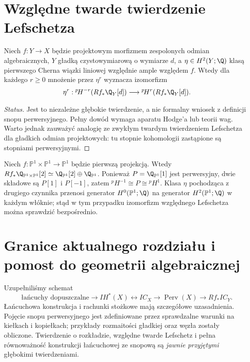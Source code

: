 \section{Względne twarde twierdzenie Lefschetza}
\begin{twierdzenie}
\label{thm:relative-hard-lefschetz-xiii}
Niech $f:Y\to X$ będzie projektowym morfizmem
zespolonych odmian algebraicznych, $Y$
gładką czystowymiarową o wymiarze $d$,
a $\eta\in H^2(Y;\Q)$ klasą pierwszego Cherna
wiązki liniowej względnie ample względem $f$.
Wtedy dla każdego $r\ge0$ mnożenie przez
$\eta^r$ wyznacza izomorfizm
\[
\eta^r:{}^p\!H^{-r}(Rf_*\Q_Y[d])
\longrightarrow{}^p\!H^{r}(Rf_*\Q_Y[d]).
\]
\end{twierdzenie}
\begin{proof}[Status]
Jest to niezależne głębokie twierdzenie, a nie
formalny wniosek z definicji snopu perwersyjnego.
Pełny dowód wymaga aparatu Hodge'a lub teorii wag.
Warto jednak zauważyć analogię ze zwykłym twardym
twierdzeniem Lefschetza dla gładkich odmian
projektowych: tu stopnie kohomologii zastąpione
są stopniami perwersyjnymi.
\end{proof}
\begin{przyklad}
Niech $f:\mathbb P^1\times\mathbb P^1\to\mathbb P^1$
będzie pierwszą projekcją. Wtedy
$Rf_*\Q_{\mathbb P^1\times\mathbb P^1}[2]
\simeq\Q_{\mathbb P^1}[2]\oplus\Q_{\mathbb P^1}$.
Ponieważ $P=\Q_{\mathbb P^1}[1]$ jest perwersyjny,
dwie składowe są $P[1]$ i $P[-1]$, zatem
${}^p\!H^{-1}\cong P\cong{}^p\!H^{1}$.
Klasa $\eta$ pochodząca z drugiego czynnika
przenosi generator $H^0(\mathbb P^1;\Q)$ na
generator $H^2(\mathbb P^1;\Q)$ w każdym włóknie;
stąd w tym przypadku izomorfizm względnego
Lefschetza można sprawdzić bezpośrednio.
\end{przyklad}

\section{Granice aktualnego rozdziału i pomost do geometrii algebraicznej}
Uzupełniliśmy schemat
\[
\text{łańcuchy dopuszczalne}
\longrightarrow IH^*(X)
\longleftrightarrow IC_X
\longrightarrow\operatorname{Perv}(X)
\longrightarrow Rf_*IC_Y.
\]
Łańcuchowa konstrukcja i rachunki stożkowe
mają szczegółowe uzasadnienia. Pojęcie snopu
perwersyjnego jest zdefiniowane przez
sprawdzalne warunki na kiełkach i kopiełkach;
przykłady rozmaitości gładkiej oraz węzła
zostały obliczone. Twierdzenie o rozkładzie,
względne twarde Lefschetz i pełna równoważność
konstrukcji łańcuchowej ze snopową są
\emph{jawnie przyjętymi} głębokimi twierdzeniami.

